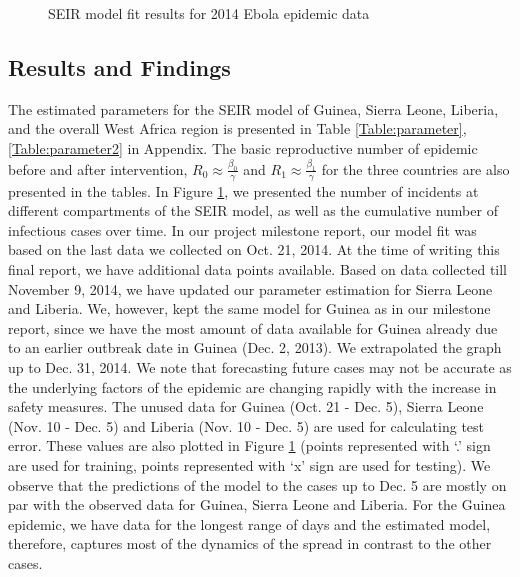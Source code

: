 \documentclass[10pt, journal,onecolumn]{IEEEtran}
\begin{document}
\begin{figure}[ht]
\quad
{}

\caption{SEIR model fit results for 2014 Ebola epidemic data}
\label{Fig:figurePrediction}
\end{figure}


\subsection{Results and Findings}
The estimated parameters for the SEIR model of Guinea, Sierra Leone, Liberia, and the overall West Africa 
region is presented in Table \ref{Table:parameter}, \ref{Table:parameter2} in Appendix. The basic reproductive number of epidemic before and after intervention, $R_0 \approx \frac{\beta_0}{\gamma}$  and $R_1 \approx \frac{\beta_1}{\gamma}$ for the three countries are also presented in the tables. In Figure \ref{Fig:figurePrediction}, we presented the number of incidents at different compartments of the SEIR model, as well as the cumulative number of infectious cases over time. In our project milestone report, our model fit was based on the last data we collected on Oct. 21, 2014. At the time of writing this final report, we have additional data points available. Based on data collected till November 9, 2014, we have updated our parameter estimation for Sierra Leone and Liberia. We, however, kept the same model for Guinea as in our milestone report, since we have the most amount of data available for Guinea already due to an earlier outbreak date in Guinea (Dec. 2, 2013). We extrapolated the graph up to Dec. 31, 2014.  We note that forecasting future cases may not be accurate as the underlying factors of the epidemic are changing rapidly with the increase in safety measures. The unused data for Guinea (Oct. 21 - Dec. 5), Sierra Leone (Nov. 10 - Dec. 5) and Liberia (Nov. 10 - Dec. 5) are used for calculating test error. These values are also plotted in Figure \ref{Fig:figurePrediction} (points represented with `.' sign are used for training, points represented with `x' sign are used for testing). We observe that the predictions of the model to the cases up to Dec. 5 are mostly on par with the observed data for Guinea, Sierra Leone and Liberia. For the Guinea epidemic, we have data for the longest range of days and the estimated model, therefore, captures most of the
dynamics of the spread in contrast to the other cases.  
\end{document}
